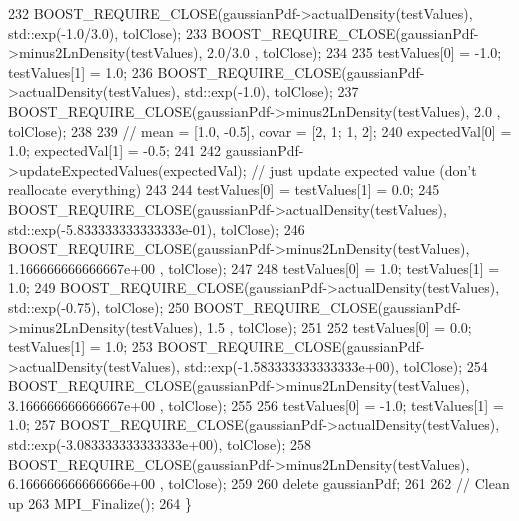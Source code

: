 \begin{DoxyCode}
232   BOOST\_REQUIRE\_CLOSE(gaussianPdf->actualDensity(testValues), std::exp(-1.0/3.0), tolClose);
233   BOOST\_REQUIRE\_CLOSE(gaussianPdf->minus2LnDensity(testValues),         2.0/3.0 , tolClose);
234 
235   testValues[0] = -1.0; testValues[1] = 1.0;
236   BOOST\_REQUIRE\_CLOSE(gaussianPdf->actualDensity(testValues), std::exp(-1.0), tolClose);
237   BOOST\_REQUIRE\_CLOSE(gaussianPdf->minus2LnDensity(testValues),         2.0 , tolClose);
238 
239   \textcolor{comment}{// mean = [1.0, -0.5], covar = [2, 1; 1, 2];}
240   expectedVal[0] = 1.0; expectedVal[1] = -0.5;
241 
242   gaussianPdf->updateExpectedValues(expectedVal); \textcolor{comment}{// just update expected value (don't reallocate
       everything)}
243 
244   testValues[0] = testValues[1] = 0.0;
245   BOOST\_REQUIRE\_CLOSE(gaussianPdf->actualDensity(testValues), std::exp(-5.833333333333333e-01), tolClose);
246   BOOST\_REQUIRE\_CLOSE(gaussianPdf->minus2LnDensity(testValues),         1.166666666666667e+00 , tolClose);
247 
248   testValues[0] = 1.0; testValues[1] = 1.0;
249   BOOST\_REQUIRE\_CLOSE(gaussianPdf->actualDensity(testValues), std::exp(-0.75), tolClose);
250   BOOST\_REQUIRE\_CLOSE(gaussianPdf->minus2LnDensity(testValues),         1.5 , tolClose);
251 
252   testValues[0] = 0.0; testValues[1] = 1.0;
253   BOOST\_REQUIRE\_CLOSE(gaussianPdf->actualDensity(testValues), std::exp(-1.583333333333333e+00), tolClose);
254   BOOST\_REQUIRE\_CLOSE(gaussianPdf->minus2LnDensity(testValues),         3.166666666666667e+00 , tolClose);
255 
256   testValues[0] = -1.0; testValues[1] = 1.0;
257   BOOST\_REQUIRE\_CLOSE(gaussianPdf->actualDensity(testValues), std::exp(-3.083333333333333e+00), tolClose);
258   BOOST\_REQUIRE\_CLOSE(gaussianPdf->minus2LnDensity(testValues),         6.166666666666666e+00 , tolClose);
259 
260   \textcolor{keyword}{delete} gaussianPdf;
261 
262   \textcolor{comment}{// Clean up}
263   MPI\_Finalize();
264 \}
\end{DoxyCode}
